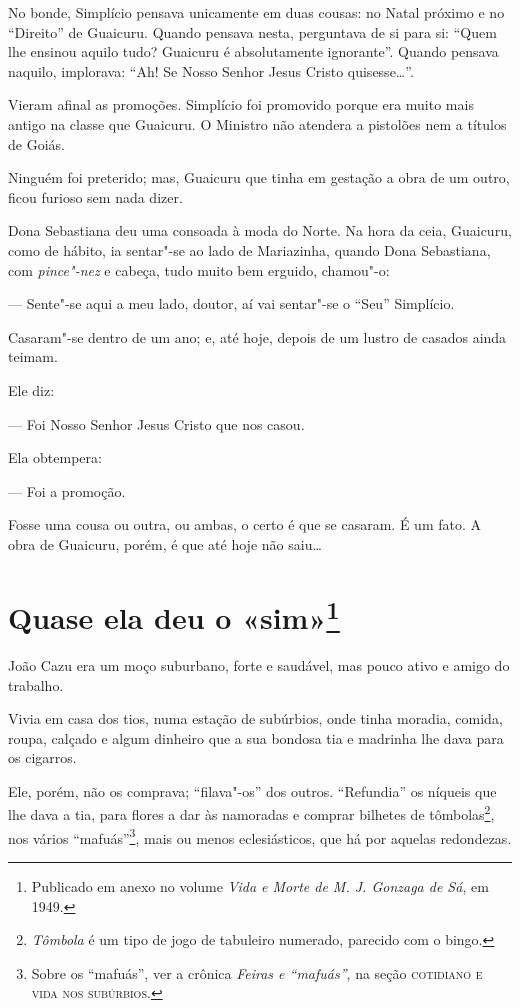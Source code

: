 No bonde, Simplício pensava unicamente em duas cousas: no Natal próximo
e no ``Direito'' de Guaicuru. Quando pensava nesta, perguntava de si
para si: ``Quem lhe ensinou aquilo tudo? Guaicuru é absolutamente
ignorante''. Quando pensava naquilo, implorava: ``Ah! Se Nosso Senhor
Jesus Cristo quisesse\ldots{}''.

Vieram afinal as promoções. Simplício foi promovido porque era muito
mais antigo na classe que Guaicuru. O Ministro não atendera a pistolões
nem a títulos de Goiás.

Ninguém foi preterido; mas, Guaicuru que tinha em gestação a obra de um
outro, ficou furioso sem nada dizer.

Dona Sebastiana deu uma consoada à moda do Norte. Na hora da ceia,
Guaicuru, como de hábito, ia sentar"-se ao lado de Mariazinha, quando
Dona Sebastiana, com \emph{pince"-nez} e cabeça, tudo muito bem erguido,
chamou"-o:

--- Sente"-se aqui a meu lado, doutor, aí vai sentar"-se o ``Seu''
Simplício.

Casaram"-se dentro de um ano; e, até hoje, depois de um lustro de casados
ainda teimam.

Ele diz:

--- Foi Nosso Senhor Jesus Cristo que nos casou.

Ela obtempera:

--- Foi a promoção.

Fosse uma cousa ou outra, ou ambas, o certo é que se casaram. É um fato.
A obra de Guaicuru, porém, é que até hoje não saiu\ldots{}



\chapter[Quase ela deu o «sim»]{Quase ela deu o «sim»\footnote[*]{Publicado em anexo no volume \emph{Vida e Morte de M. J. Gonzaga de Sá}, em 1949.}}

João Cazu era um moço suburbano, forte e saudável, mas pouco ativo e
amigo do trabalho.

Vivia em casa dos tios, numa estação de subúrbios, onde tinha moradia,
comida, roupa, calçado e algum dinheiro que a sua bondosa tia e madrinha
lhe dava para os cigarros.

Ele, porém, não os comprava; ``filava"-os'' dos outros. ``Refundia'' os
níqueis que lhe dava a tia, para flores a dar às namoradas e comprar
bilhetes de tômbolas\footnote{\emph{Tômbola} é um tipo de jogo de
  tabuleiro numerado, parecido com o bingo.}, nos vários
``mafuás''\footnote{Sobre os ``mafuás'', ver a crônica \emph{Feiras e
  ``mafuás''}, na seção \textsc{cotidiano e vida nos subúrbios}.}, mais ou menos
eclesiásticos, que há por aquelas redondezas.

